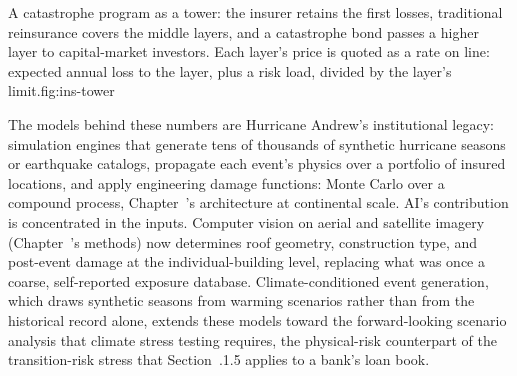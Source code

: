 \documentclass[../ai_in_finance]{subfiles}
\begin{document}
\begin{bookfigure}{A catastrophe program as a tower: the insurer retains the first losses, traditional reinsurance covers the middle layers, and a catastrophe bond passes a higher layer to capital-market investors. Each layer's price is quoted as a rate on line: expected annual loss to the layer, plus a risk load, divided by the layer's limit.}{fig:ins-tower}
\end{bookfigure}

The models behind these numbers are Hurricane Andrew's institutional legacy: simulation engines that generate tens of thousands of synthetic hurricane seasons or earthquake catalogs, propagate each event's physics over a portfolio of insured locations, and apply engineering damage functions: Monte Carlo over a compound process, Chapter~'s architecture at continental scale. AI's contribution is concentrated in the inputs. Computer vision on aerial and satellite imagery (Chapter~'s methods) now determines roof geometry, construction type, and post-event damage at the individual-building level, replacing what was once a coarse, self-reported exposure database. Climate-conditioned event generation, which draws synthetic seasons from warming scenarios rather than from the historical record alone, extends these models toward the forward-looking scenario analysis that climate stress testing requires, the physical-risk counterpart of the transition-risk stress that Section~.1.5 applies to a bank's loan book.
\end{document}
